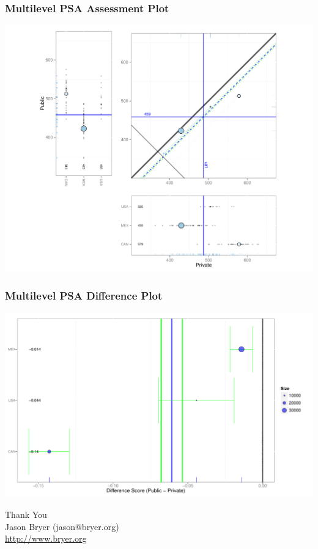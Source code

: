 \documentclass[10pt,slidestop,mathserif,c]{beamer}
\begin{document}
\begin{frame}
    \frametitle{Multilevel PSA Assessment Plot}
    \begin{center}
        \includegraphics{figures/Slides-mlpsaplot}
    \end{center}
\end{frame}

\begin{frame}
    \frametitle{Multilevel PSA Difference Plot}
    \begin{center}
        \includegraphics{figures/Slides-mlpsadiffplot}
    \end{center}
\end{frame}



\begin{frame}[c]
	\LARGE{Thank You}\\[.2in]
	\normalsize
	Jason Bryer (jason@bryer.org)\\
	\url{http://www.bryer.org}
\end{frame}
\end{document}
